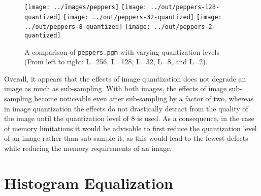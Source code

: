 \documentclass[headings=optiontoheadandtoc,listof=totoc,parskip=full]{scrartcl}
\begin{document}
\begin{figure}[ht]
	\centering
	\texttt{[image: ../Images/peppers]}
	\texttt{[image: ../out/peppers-128-quantized]}
	\texttt{[image: ../out/peppers-32-quantized]}
	\texttt{[image: ../out/peppers-8-quantized]}
	\texttt{[image: ../out/peppers-2-quantized]}
	\caption{A comparison of \texttt{peppers.pgm} with varying quantization levels (From left to right: L=256, L=128, L=32, L=8, and L=2).}
	\label{fig:quantize-result-2}
\end{figure}

Overall, it appears that the effects of image quantization does not degrade an image as much as sub-sampling. With both images, the effects of image sub-sampling become noticeable even after sub-sampling by a factor of two, whereas in image quantization the effects do not drastically detract from the quality of the image until the quantization level of 8 is used. As a consequence, in the case of memory limitations it would be advisable to first reduce the quantization level of an image rather than sub-sample it, as this would lead to the fewest defects while reducing the memory requirements of an image.

\section{Histogram Equalization}
\end{document}

